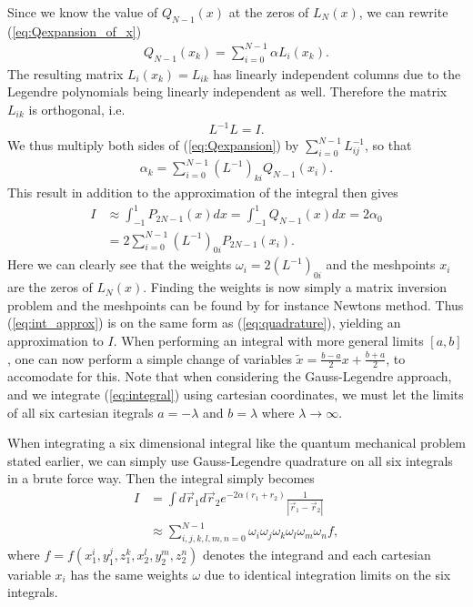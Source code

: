 \documentclass[twocolumn]{aastex62}
\begin{document}
Since we know the value of $Q_{N-1}(x)$ at the zeros of $L_N(x)$, we can rewrite (\ref{eq:Qexpansion_of_x})
\begin{align}
	Q_{N-1} (x_k)= \sum^{N-1}_{i=0} \alpha L_i(x_k).
	\label{eq:Qexpansion}
\end{align}
The resulting matrix $L_i(x_k) = L_{ik}$ has linearly independent columns due to the Legendre polynomials being linearly independent as well. Therefore the matrix $L_{ik}$ is orthogonal, i.e.
\begin{align}
	L^{-1}L = I.
\end{align}
We thus multiply both sides of (\ref{eq:Qexpansion}) by $\sum^{N-1}_{i=0}L^{-1}_{ij}$, so that 
\begin{align}
	\alpha_k = \sum_{i=0}^{N-1} (L^{-1})_{ki}Q_{N-1}(x_i).
\end{align}
This result in addition to the approximation of the integral then gives
\begin{align}
	I &\approx \int^1_{-1} P_{2N-1}(x)dx = \int^1_{-1} Q_{N-1}(x)dx = 2\alpha_0 \\
	&= 2 \sum^{N-1}_{i=0} (L^{-1})_{0i}P_{2N-1}(x_i).
	\label{eq:int_approx}
\end{align}
Here we can clearly see that the weights $\omega_i = 2(L^{-1})_{0i}$ and the meshpoints $x_i$ are the zeros of $L_N(x)$. Finding the weights is now simply a matrix inversion problem and the meshpoints can be found by for instance Newtons method. Thus (\ref{eq:int_approx}) is on the same form as (\ref{eq:quadrature}), yielding an approximation to $I$. When performing an integral with more general limits $[a,b]$, one can now perform a simple change of variables $\tilde{x} = \frac{b - a}{2}x + \frac{b + a}{2}$, to accomodate for this. Note that when considering the Gauss-Legendre approach, and we integrate (\ref{eq:integral}) using cartesian coordinates, we must let the limits of all six cartesian itegrals $a = -\lambda$ and $b = \lambda$ where $\lambda\to\infty$.

When integrating a six dimensional integral like the quantum mechanical problem stated earlier, we can simply use Gauss-Legendre quadrature on all six integrals in a brute force way. Then the integral simply becomes 
\begin{align}
	I &= \int d\vec{r}_1d\vec{r}_2 e^{-2\alpha(r_1 + r_2)}\frac{1}{|\vec{r}_1 - \vec{r}_2|} \\
	&\approx \sum_{i, j, k, l, m, n = 0}^{N-1} \omega_i \omega_j \omega_k \omega_l \omega_m \omega_n f,
\end{align} 
where $f = f(x_1^i, y_1^j, z_1^k, x_2^l, y_2^m, z_2^n)$ denotes the integrand and each cartesian variable $x_i$ has the same weights $\omega$ due to identical integration limits on the six integrals. 
\end{document}

